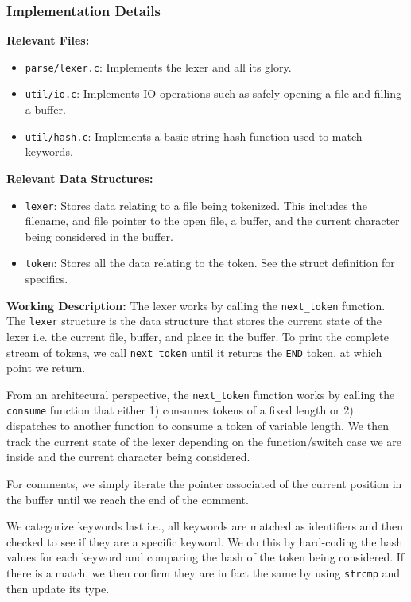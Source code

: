 \documentclass{article}
\begin{document}
\subsubsection{Implementation Details}

\textbf{Relevant Files:}

\begin{itemize}
    \item \verb|parse/lexer.c|: Implements the lexer and all its glory.
    \item \verb|util/io.c|: Implements IO operations such as safely opening a file and filling a buffer.
    \item \verb|util/hash.c|: Implements a basic string hash function used to match keywords.
\end{itemize}

\noindent \textbf{Relevant Data Structures:}

\begin{itemize}
    \item \verb|lexer|: Stores data relating to a file being tokenized. This includes the filename, and file pointer to the open file, a buffer, and the current character being considered in the buffer.
    \item \verb|token|: Stores all the data relating to the token. See the struct definition for specifics.
\end{itemize}

\noindent \textbf{Working Description:} The lexer works by calling the \verb|next_token| function. The \verb|lexer| structure is the data structure that stores the current state of the lexer i.e. the current file, buffer, and place in the buffer. To print the complete stream of tokens, we call \verb|next_token| until it returns the \verb|END| token, at which point we return.

From an architecural perspective, the \verb|next_token| function works by calling the \verb|consume| function that either 1) consumes tokens of a fixed length or 2) dispatches to another function to consume a token of variable length. We then track the current state of the lexer depending on the function/switch case we are inside and the current character being considered. 

For comments, we simply iterate the pointer associated of the current position in the buffer until we reach the end of the comment.

We categorize keywords last i.e., all keywords are matched as identifiers and then checked to see if they are a specific keyword. We do this by hard-coding the hash values for each keyword and comparing the hash of the token being considered. If there is a match, we then confirm they are in fact the same by using \verb|strcmp| and then update its type.
\end{document}
